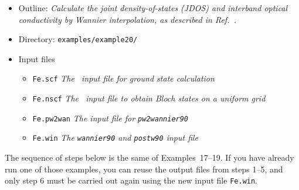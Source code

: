 \documentclass[a4paper,11pt,twoside]{article}
\begin{document}
\begin{itemize}
\item{Outline: \it{Calculate the joint density-of-states (JDOS) and
      interband optical conductivity by Wannier interpolation, as
      described in Ref.~\cite{WanInt}.}}
\item{Directory: {\tt examples/example20/}}
\item{Input files}
\begin{itemize}
\item{ {\tt Fe.scf} {\it The \pwscf\ input file for ground state
    calculation}}
\item{ {\tt Fe.nscf}  {\it The \pwscf\ input file to obtain Bloch
    states on a uniform grid}} 
\item{ {\tt Fe.pw2wan}  {\it The input file for {\tt pw2wannier90}}}
\item{ {\tt Fe.win}  {\it The {\tt wannier90} and {\tt postw90} input file}}
\end{itemize}
\end{itemize}

The sequence of steps below is the same of Examples~17--19.  If you
have already run one of those examples, you can reuse the output files
from steps 1--5, and only step 6 must be carried out again using the
new input file {\tt Fe.win}.
\end{document}
